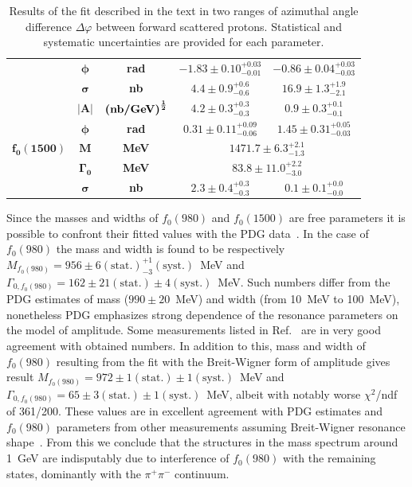 {\begin{table}[]
\begin{tabular}{ccc c c}
& $\bm{\phi}$ & \bf{rad} & $-1.83 \pm 0.10 ^{+0.03}_{-0.01}$ & $-0.86 \pm 0.04 ^{+0.03}_{-0.03}$ \\ %
& $\bm{\sigma}$ & \bf{nb} & $4.4 \pm 0.9 ^{+0.6}_{-0.6}$ & $16.9 \pm 1.3 ^{+1.9}_{-2.1}$ \\ \hline
\multirow{5}{*}{$\bm{f_{0}(1500)}$} & $\bm{|A|}$ & $\bm{\left(\text{\bf{nb/GeV}}\right)^{\frac{1}{2}}}$ & $4.2 \pm 0.3 ^{+0.3}_{-0.3}$ & $0.9 \pm 0.3 ^{+0.1}_{-0.1}$ \\ %
& $\bm{\phi}$ & \bf{rad} & $0.31 \pm 0.11 ^{+0.09}_{-0.06}$ & $1.45 \pm 0.31 ^{+0.05}_{-0.03}$ \\ %
& $\bm{M}$ & \bf{MeV} & \multicolumn{2}{c}{$1471.7 \pm 6.3 ^{+2.1}_{-1.3}$} \\ %
& $\bm{\Gamma_{0}}$ & \bf{MeV} & \multicolumn{2}{c}{$83.8 \pm 11.0 ^{+2.2}_{-3.0}$} \\ %
& $\bm{\sigma}$ & \bf{nb} & $2.3 \pm 0.4 ^{+0.3}_{-0.3}$ & $0.1 \pm 0.1 ^{+0.0}_{-0.0}$ \\ \hline
\end{tabular}
\caption{Results of the fit described in the text in two ranges of azimuthal angle difference $\Delta\varphi$ between forward scattered protons. Statistical and systematic uncertainties are provided for each parameter.}\label{tab:fitRes}\vspace{-5pt} %
\end{table}
}
%
%

Since the masses and widths of $f_0(980)$ and $f_0(1500)$ are free parameters it is possible to confront their fitted values with the PDG data~\cite{pdg}. In the case of $f_0(980)$ the mass and width is found to be respectively $M_{f_0(980)}=956 \pm 6 (\text{stat.}) ^{+1}_{-3} (\text{syst.})$~MeV and $\Gamma_{0,f_0(980)} = 162 \pm 21 (\text{stat.}) \pm 4 (\text{syst.})$~MeV. Such numbers differ from the PDG estimates of mass ($990 \pm 20$~MeV) and width (from 10~MeV to 100~MeV), nonetheless PDG emphasizes strong dependence of the resonance parameters on the model of amplitude. Some measurements listed in Ref.~\cite{pdg} are in very good agreement with obtained numbers. In addition to this, mass and width of $f_0(980)$ resulting from the fit with the Breit-Wigner form of amplitude gives result $M_{f_0(980)}=972 \pm 1 (\text{stat.}) \pm 1 (\text{syst.})$~MeV and $\Gamma_{0,f_0(980)} = 65 \pm 3 (\text{stat.}) \pm 1 (\text{syst.})$~MeV, albeit with notably worse $\chi^{2}$/ndf of 361/200. These values are in excellent agreement with PDG estimates and $f_0(980)$ parameters from other measurements assuming Breit-Wigner resonance shape~\cite{pdg}. From this we conclude that the structures in the mass spectrum around 1~GeV are indisputably due to interference of $f_0(980)$ with the remaining states, dominantly with the $\pi^{+}\pi^{-}$ continuum.
%
%

